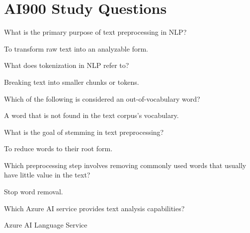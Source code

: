 \chapter{AI900 Study Questions}
\resetquestioncounter{}
\begin{qanda}
	\begin{question}
What is the primary purpose of text preprocessing in NLP?
	\end{question}
	\begin{answer}
To transform raw text into an analyzable form.
	\end{answer}
\end{qanda}

\begin{qanda}
	\begin{question}
What does tokenization in NLP refer to?
	\end{question}
	\begin{answer}
Breaking text into smaller chunks or tokens.
	\end{answer}
\end{qanda}

\begin{qanda}
	\begin{question}
Which of the following is considered an out-of-vocabulary word?
	\end{question}
	\begin{answer}
A word that is not found in the text corpus's vocabulary.
	\end{answer}
\end{qanda}

\begin{qanda}
	\begin{question}
What is the goal of stemming in text preprocessing?
	\end{question}
	\begin{answer}
To reduce words to their root form.
	\end{answer}
\end{qanda}

\begin{qanda}
	\begin{question}
Which preprocessing step involves removing commonly used words that usually have little value in the text?
	\end{question}
	\begin{answer}
Stop word removal.
	\end{answer}
\end{qanda}

\begin{qanda}
	\begin{question}
Which Azure AI service provides text analysis capabilities?
	\end{question}
	\begin{answer}
Azure AI Language Service
	\end{answer}
\end{qanda}

